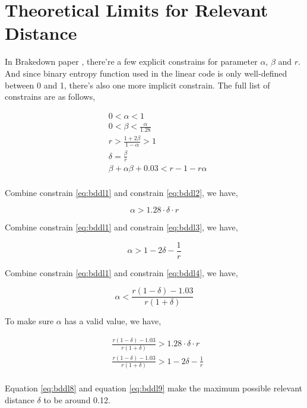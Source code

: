 \section{Theoretical Limits for Relevant Distance}

In Brakedown paper \cite{brakedown}, there're a few explicit constrains for parameter $\alpha$, $\beta$ and $r$. And since binary entropy function used in the linear code is only well-defined between 0 and 1, there's also one more implicit constrain. The full list of constrains are as follows,

\begin{align}
& 0 < \alpha < 1 \nonumber \\
& 0 < \beta < \frac{\alpha}{1.28} \label{eq:bddl2} \\
& r > \frac{1 + 2\beta}{1 - \alpha} > 1 \label{eq:bddl3} \\
& \delta = \frac{\beta}{r} \label{eq:bddl1} \\
& \beta + \alpha\beta + 0.03 < r - 1 - r\alpha \label{eq:bddl4} \\
\end{align}

Combine constrain \ref{eq:bddl1} and constrain \ref{eq:bddl2}, we have,

\begin{equation}
\label{eq:bddl5}
    \alpha > 1.28 \cdot \delta \cdot r 
\end{equation}
    

Combine constrain \ref{eq:bddl1} and constrain \ref{eq:bddl3}, we have,

\begin{equation}
\label{eq:bddl6}
    \alpha > 1 - 2\delta - \frac{1}{r} 
\end{equation}


Combine constrain \ref{eq:bddl1} and constrain \ref{eq:bddl4}, we have,

\begin{equation}
\label{eq:bddl7}
    \alpha < \frac{r(1 - \delta) - 1.03}{r(1 + \delta)}
\end{equation}

To make sure $\alpha$ has a valid value, we have,

\begin{align}
& \frac{r(1 - \delta) - 1.03}{r(1 + \delta)} > 1.28 \cdot \delta \cdot r \label{eq:bddl8} \\
& \frac{r(1 - \delta) - 1.03}{r(1 + \delta)} > 1 - 2\delta - \frac{1}{r}  \label{eq:bddl9} \\
\end{align}

Equation \ref{eq:bddl8} and equation \ref{eq:bddl9} make the maximum possible relevant distance $\delta$ to be around 0.12.